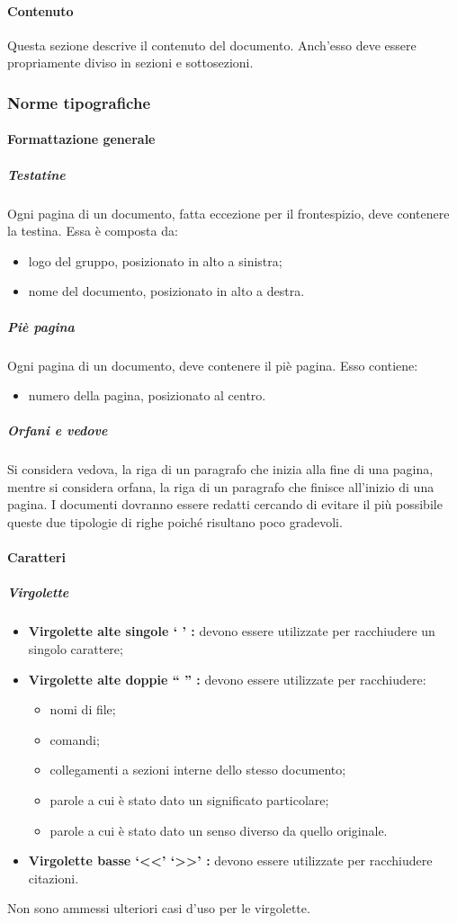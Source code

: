 \documentclass[../NormeProgetto.text]{subfiles}
\begin{document}
		\paragraph{Contenuto}
			Questa sezione descrive il contenuto del documento. Anch'esso deve essere propriamente diviso in sezioni e sottosezioni.
	
	\subsubsection{Norme tipografiche} \label{sec:Norme tipografiche}
		\paragraph{Formattazione generale}
			\subparagraph{Testatine}
				Ogni pagina di un documento, fatta eccezione per il frontespizio, deve contenere la testina. Essa è composta da:
				\begin{itemize}
					\item logo del gruppo, posizionato in alto a sinistra;
					\item nome del documento, posizionato in alto a destra.
				\end{itemize}
			\subparagraph{Piè pagina}
				Ogni pagina di un documento, deve contenere il piè pagina. Esso contiene:
				\begin{itemize}
					\item numero della pagina, posizionato al centro.
				\end{itemize}
			\subparagraph{Orfani e vedove}
				Si considera vedova, la riga di un paragrafo che inizia alla fine di una pagina, mentre si considera orfana, la riga di un paragrafo che finisce all'inizio di una pagina. I documenti dovranno essere redatti cercando di evitare il più possibile queste due tipologie di righe poiché risultano poco gradevoli. 
		\paragraph{Caratteri}
			
			\subparagraph{Virgolette}
				\begin{itemize}
					\item \textbf{Virgolette alte singole ` ' :} devono essere utilizzate per racchiudere un singolo carattere;
					\item \textbf{Virgolette alte doppie `` '' :} devono essere utilizzate per racchiudere:
					\begin{itemize}
						\item nomi di file;
						\item comandi;
						\item collegamenti a sezioni interne dello stesso documento;
						\item parole a cui è stato dato un significato particolare;
						\item parole a cui è stato dato un senso diverso da quello originale.
					\end{itemize}
					\item \textbf{Virgolette basse `<<' `>>' :} devono essere utilizzate per racchiudere citazioni.
				\end{itemize}
				Non sono ammessi ulteriori casi d'uso per le virgolette.
			
\end{document}
